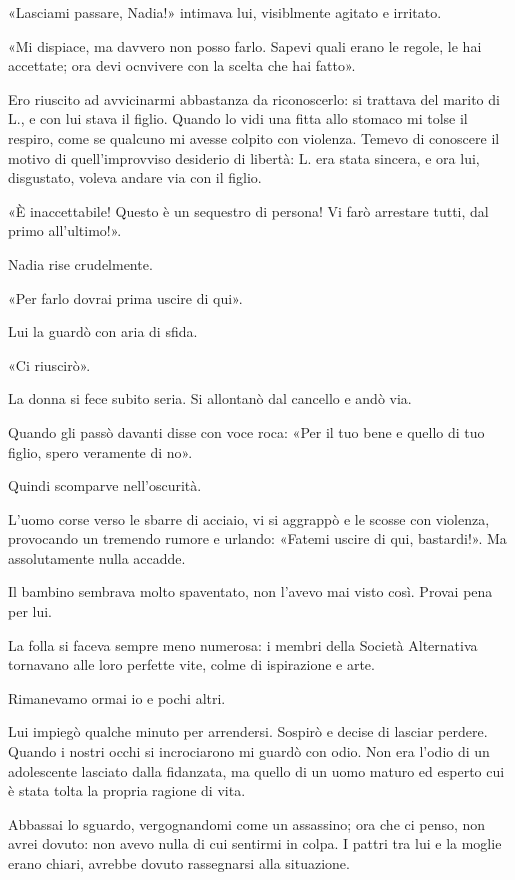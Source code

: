 \documentclass[a4paper,12pt]{book}
\begin{document}
«Lasciami passare, Nadia!» intimava lui, visiblmente agitato e irritato.

«Mi dispiace, ma davvero non posso farlo. Sapevi quali erano le regole, le hai
accettate; ora devi ocnvivere con la scelta che hai fatto».

Ero riuscito ad avvicinarmi abbastanza da riconoscerlo: si trattava del marito
di L., e con lui stava il figlio. Quando lo vidi una fitta allo stomaco mi
tolse il respiro, come se qualcuno mi avesse colpito con violenza. Temevo di
conoscere il motivo di quell'improvviso desiderio di libertà: L. era stata
sincera, e ora lui, disgustato, voleva andare via con il figlio.

«È inaccettabile! Questo è un sequestro di persona! Vi farò arrestare tutti, dal
primo all'ultimo!».

Nadia rise crudelmente.

«Per farlo dovrai prima uscire di qui».

Lui la guardò con aria di sfida.

«Ci riuscirò».

La donna si fece subito seria. Si allontanò dal cancello e andò via.

Quando gli passò davanti disse con voce roca: «Per il tuo bene e quello di tuo
figlio, spero veramente di no».

Quindi scomparve nell'oscurità.

L'uomo corse verso le sbarre di acciaio, vi si aggrappò e le scosse con
violenza, provocando un tremendo rumore e urlando: «Fatemi uscire di qui,
bastardi!». Ma assolutamente nulla accadde.

Il bambino sembrava molto spaventato, non l'avevo mai visto così. Provai pena
per lui.

La folla si faceva sempre meno numerosa: i membri della Società Alternativa
tornavano alle loro perfette vite, colme di ispirazione e arte.

Rimanevamo ormai io e pochi altri.

Lui impiegò qualche minuto per arrendersi. Sospirò e decise di lasciar perdere.
Quando i nostri occhi si incrociarono mi guardò con odio. Non era l'odio di un
adolescente lasciato dalla fidanzata, ma quello di un uomo maturo ed esperto cui
è stata tolta la propria ragione di vita.

Abbassai lo sguardo, vergognandomi come un assassino; ora che ci penso, non avrei
dovuto: non avevo nulla di cui sentirmi in colpa. I pattri tra lui e la moglie
erano chiari, avrebbe dovuto rassegnarsi alla situazione.
\end{document}

